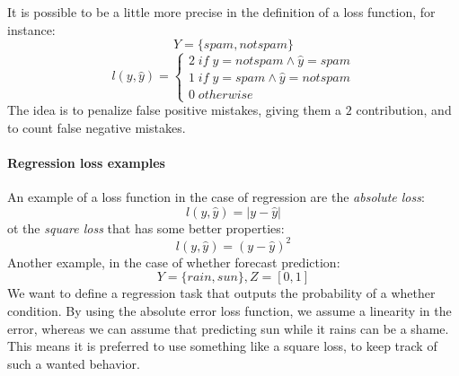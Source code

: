 It is possible to be a little more precise in the definition of a loss function, for instance:
$$Y = \{\mathit{spam}, \mathit{notspam}\}$$
\[
    l(y, \hat{y}) = \begin{cases}
        2\; \mathit{if}\; y = \mathit{notspam} \wedge \hat{y} = \mathit{spam}\\
        1\; \mathit{if}\; y = \mathit{spam} \wedge \hat{y} = \mathit{notspam}\\
        0\; \mathit{otherwise}
\end{cases}\]
The idea is to penalize false positive mistakes, giving them a $2$ contribution, 
and to count false negative mistakes. 

\paragraph{Regression loss examples}
An example of a loss function in the case of regression are the \emph{absolute loss}:
$$l(y, \hat{y}) = |y - \hat{y}|$$
ot the \emph{square loss} that has some better properties:
$$l(y, \hat{y}) = (y - \hat{y})^2$$
Another example, in the case of whether forecast prediction:
$$Y = \{\mathit{rain}, \mathit{sun}\}, Z = [0,1]$$
We want to define a regression task that outputs the probability of a whether condition.
By using the absolute error loss function, we assume a linearity in the error, 
whereas we can assume that predicting sun while it rains can be a shame.\\
This means it is preferred to use something like a square loss, to keep track of such a wanted behavior.